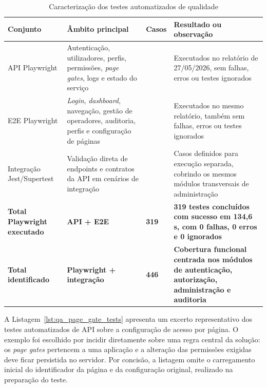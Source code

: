 \begin{table}[H]
\caption{Caracterização dos testes automatizados de qualidade}
\label{tab:testes_qa}
\begin{center}
\begingroup
\scriptsize
\setlength{\tabcolsep}{4pt}
\begin{tabular}{|>{\raggedright\arraybackslash}p{2.5cm}|>{\raggedright\arraybackslash}p{4.2cm}|>{\raggedright\arraybackslash}p{1.5cm}|>{\raggedright\arraybackslash}p{4.5cm}|}
\hline
\textbf{Conjunto} & \textbf{Âmbito principal} & \textbf{Casos} & \textbf{Resultado ou observação} \\ \hline
\gls{API} Playwright & Autenticação, utilizadores, perfis, permissões, \textit{page gates}, logs e estado do serviço & 223 & Executados no relatório de 27/05/2026, sem falhas, erros ou testes ignorados \\ \hline
\gls{E2E} Playwright & \textit{Login}, \textit{dashboard}, navegação, gestão de operadores, auditoria, perfis e configuração de páginas & 96 & Executados no mesmo relatório, também sem falhas, erros ou testes ignorados \\ \hline
Integração Jest/Supertest & Validação direta de endpoints e contratos da \gls{API} em cenários de integração & 127 & Casos definidos para execução separada, cobrindo os mesmos módulos transversais de administração \\ \hline
\textbf{Total Playwright executado} & \textbf{API + E2E} & \textbf{319} & \textbf{319 testes concluídos com sucesso em 134,6 s, com 0 falhas, 0 erros e 0 ignorados} \\ \hline
\textbf{Total identificado} & \textbf{Playwright + integração} & \textbf{446} & \textbf{Cobertura funcional centrada nos módulos de autenticação, autorização, administração e auditoria} \\ \hline
\end{tabular}
\endgroup
\end{center}
\end{table}

A Listagem~\ref{lst:qa_page_gate_tests} apresenta um excerto representativo dos testes automatizados de \gls{API} sobre a configuração de acesso por página. O exemplo foi escolhido por incidir diretamente sobre uma regra central da solução: os \textit{page gates} pertencem a uma aplicação e a alteração das permissões exigidas deve ficar persistida no servidor. Por concisão, a listagem omite o carregamento inicial do identificador da página e da configuração original, realizado na preparação do teste.

